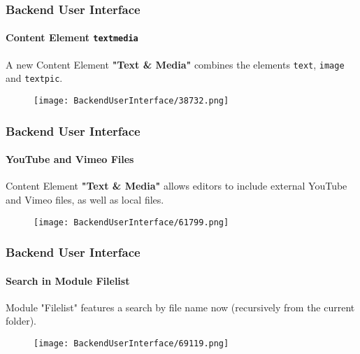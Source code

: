 \begin{frame}[fragile]
	\frametitle{Backend User Interface}
	\framesubtitle{Content Element \texttt{textmedia}}

	A new Content Element \textbf{"Text \& Media"} combines the elements
	\texttt{text}, \texttt{image} and \texttt{textpic}.

	\begin{figure}
		\texttt{[image: BackendUserInterface/38732.png]}
	\end{figure}

\end{frame}

\begin{frame}[fragile]
	\frametitle{Backend User Interface}
	\framesubtitle{YouTube and Vimeo Files}

	Content Element \textbf{"Text \& Media"} allows editors to include external
	YouTube and Vimeo files, as well as local files.

	\begin{figure}
		\texttt{[image: BackendUserInterface/61799.png]}
	\end{figure}

\end{frame}

\begin{frame}[fragile]
	\frametitle{Backend User Interface}
	\framesubtitle{Search in Module Filelist}

	Module "Filelist" features a search by file name now (recursively from the
	current folder).

	\begin{figure}
		\texttt{[image: BackendUserInterface/69119.png]}
	\end{figure}

\end{frame}

